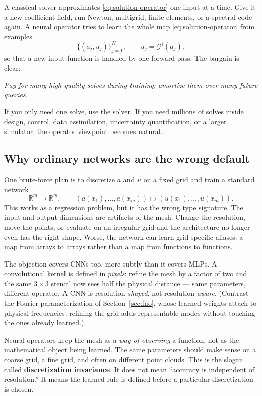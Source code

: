 \documentclass[10pt,a4paper]{article}
\newcommand{\R}{\mathbb{R}}
\newcommand{\G}{\mathcal{G}}
\begin{document}
A classical solver approximates \eqref{eq:solution-operator} one input at a
time. Give it a new coefficient field, run Newton, multigrid, finite elements,
or a spectral code again. A neural operator tries to learn the whole map
\eqref{eq:solution-operator} from examples
\[
  \{(a_j, u_j)\}_{j=1}^N,
  \qquad u_j = \G^\dagger(a_j),
\]
so that a new input function is handled by one forward pass. The bargain is
clear:
\begin{center}
\emph{Pay for many high-quality solves during training; amortize them over
many future queries.}
\end{center}
If you only need one solve, use the solver. If you need millions of solves
inside design, control, data assimilation, uncertainty quantification, or a
larger simulator, the operator viewpoint becomes natural.

\subsection{Why ordinary networks are the wrong default}

One brute-force plan is to discretize $a$ and $u$ on a fixed grid and train a
standard network
\[
  \R^{m} \to \R^{m}, \qquad (a(x_1),\ldots,a(x_m)) \mapsto
  (u(x_1),\ldots,u(x_m)).
\]
This works as a regression problem, but it has the wrong type signature. The
input and output dimensions are artifacts of the mesh. Change the resolution,
move the points, or evaluate on an irregular grid and the architecture no
longer even has the right shape. Worse, the network can learn grid-specific
aliases: a map from arrays to arrays rather than a map from functions to
functions.

The objection covers CNNs too, more subtly than it covers MLPs. A
convolutional kernel is defined in \emph{pixels}: refine the mesh by a
factor of two and the same $3 \times 3$ stencil now sees half the physical
distance --- same parameters, different operator. A CNN is
resolution-\emph{shaped}, not resolution-\emph{aware}. (Contrast the
Fourier parameterization of Section~\ref{sec:fno}, whose learned weights
attach to physical frequencies: refining the grid adds representable modes
without touching the ones already learned.)

Neural operators keep the mesh as a \emph{way of observing} a function, not as
the mathematical object being learned. The same parameters should make sense
on a coarse grid, a fine grid, and often on different point clouds. This is
the slogan called \textbf{discretization invariance}. It does not mean
``accuracy is independent of resolution.'' It means the learned rule is
defined before a particular discretization is chosen.
\end{document}
